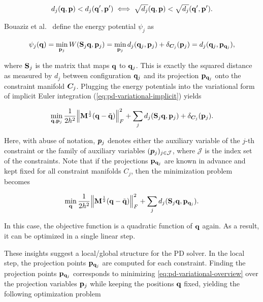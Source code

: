 \[
    d_j(\mathbf{q}, \mathbf{p}) < d_j(\mathbf{q}^\prime, \mathbf{p}^\prime) \iff \sqrt{d_j}(\mathbf{q}, \mathbf{p}) < \sqrt{d_j}(\mathbf{q}^\prime, 
    \mathbf{p}^\prime).
\]

Bouaziz et al.\ \cite{bouaziz2014} define the energy potential $\psi_j$ as 

\begin{equation}\label{eq:pd-min-W}
    \psi_j(\mathbf{q}) = \min_{\mathbf{p}_j} W(\mathbf{S}_j\mathbf{q}, \mathbf{p}_j) 
    = \min_{\mathbf{p}_j} d_j(\mathbf{q}_j, \mathbf{p}_j) + \delta_{\bm{C}_j}(\mathbf{p}_j)
    = d_j(\mathbf{q}_j, \mathbf{p}_{\mathbf{q}_j}),
\end{equation}

\noindent where $\mathbf{S}_j$ is the matrix that maps $\mathbf{q}$ to $\mathbf{q}_j$. This is exactly the squared distance as measured by 
$d_j$ between configuration $\mathbf{q}_j$ and its projection $\mathbf{p}_{\mathbf{q}_j}$ onto the constraint manifold $\bm{C}_j$. 
Plugging the energy potentials into the variational form of implicit Euler integration (\cref{eq:pd-variational-implicit}) yields

\begin{equation}\label{eq:pd-variational-overview}
    \min_{\mathbf{q}, \mathbf{p}_j} \frac{1}{2h^2} \norm{\mathbf{M}^{\frac{1}{2}}(\mathbf{q} - \tilde{\mathbf{q}})}^2_F + 
    \sum_j d_j(\mathbf{S}_j \mathbf{q}, \mathbf{p}_j) + \delta_{\bm{C}_j}(\mathbf{p}_j).
\end{equation}

\noindent Here, with abuse of notation, $\bm{p}_j$ denotes either the auxiliary variable of the $j$-th constraint or 
the family of auxiliary variables $(\bm{p}_j)_{j \in \mathcal{J}}$, where $\mathcal{J}$ is the index set of the 
constraints. Note that if the projections $\mathbf{p}_{\mathbf{q}_j}$ are known in advance and kept fixed for all constraint 
manifolds $C_j$, then the minimization problem becomes

\begin{equation}\label{eq:pd-global-d}
    \min_\mathbf{q} \frac{1}{2h^2} \norm{\mathbf{M}^{\frac{1}{2}}(\mathbf{q} - \tilde{\mathbf{q}})}^2_F + \sum_j d_j(\mathbf{S}_j
    \mathbf{q}, \mathbf{p}_{\mathbf{q}_j}).
\end{equation}

\noindent In this case, the objective function is a quadratic function of $\mathbf{q}$ again. As a result, it can be optimized in a single 
linear step. 

These insights suggest a local/global structure for the PD solver. In the local step, the projection points $\mathbf{p}_{\mathbf{q}_j}$
are computed for each constraint. Finding the projection points $\mathbf{p}_{\mathbf{q}_j}$ corresponds to minimizing 
\autoref{eq:pd-variational-overview} over the projection variables $\mathbf{p}_j$ while keeping the positions $\mathbf{q}$ fixed, yielding
the following optimization problem

